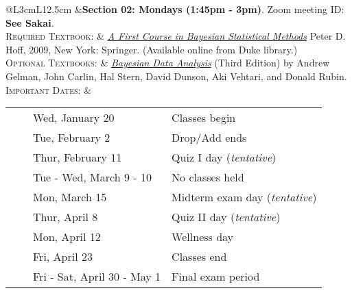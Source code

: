 \documentclass[11pt, a4paper]{article}
\newcommand{\tabitem}{~~\llap{\textbullet}~~}
\begin{document}
\begin{center}
\begin{minipage}[t]{.95\textwidth}
\begin{tabular}{@{}L{3cm}L{12.5cm}}
			&\textbf{Section 02: Mondays (1:45pm - 3pm)}. 
			\newline Zoom meeting ID: \textbf{See Sakai}.  \\
			\textsc{Required Textbook:} & \href{https://find.library.duke.edu/catalog/DUKE004968562}{\textit{A First Course in Bayesian Statistical Methods}} Peter D. Hoff, 2009, New York: Springer. (Available online from Duke library.)\\
			\textsc{Optional Textbooks:}	& \href{https://find.library.duke.edu/catalog/DUKE006588051?utm_campaign=bento&utm_content=bento_result_link&utm_source=library.duke.edu&utm_medium=referral}{\textit{Bayesian Data Analysis}} (Third Edition) by Andrew Gelman, John Carlin, Hal Stern, David Dunson, Aki Vehtari, and Donald Rubin. \\
			\textsc{Important Dates:} & \begin{minipage}[t]{.95\textwidth}
				\begin{tabular}{@{}ll}
					\tabitem Wed, January 20 & Classes begin \\
					\tabitem Tue, February 2 & Drop/Add ends \\
					\tabitem Thur, February 11 & Quiz I day (\textit{tentative})\\
					\tabitem Tue - Wed, March 9 - 10	& No classes held \\
					\tabitem Mon, March 15 & Midterm exam day (\textit{tentative})\\
					\tabitem Thur, April 8 & Quiz II day (\textit{tentative})\\
					\tabitem Mon, April 12	& Wellness day \\
					\tabitem Fri, April 23 & Classes end \\
					\tabitem Fri - Sat, April 30 - May 1 & Final exam period \\
				\end{tabular}
			\end{minipage} \\
			\bottomrule[0.065cm]
		\end{tabular}
	\end{minipage}
\end{center}



\vspace{.5cm}
\setlength{\unitlength}{1in}
\renewcommand{\arraystretch}{1.5}
\end{document}
